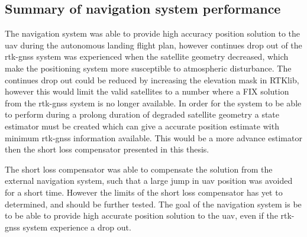 \subsection{Summary of navigation system performance}
The navigation system was able to provide high accuracy position solution to the \gls{uav} during the autonomous landing flight plan, however continues drop out of the \gls{rtk-gnss} system was experienced when the satellite geometry decreased, which make the positioning system more susceptible to atmospheric disturbance. The continues drop out could be reduced by increasing the elevation mask in RTKlib, however this would limit the valid satellites to a number where a FIX solution from the \gls{rtk-gnss} system is no longer available. In order for the system to be able to perform during a prolong duration of degraded satellite geometry a state estimator must be created which can give a accurate position estimate with minimum \gls{rtk-gnss} information available. This would be a more advance estimator then the short loss compensator presented in this thesis.

The short loss compensator was able to compensate the solution from the external navigation system, such that a large jump in \gls{uav} position was avoided for a short time. However the limits of the short loss compensator has yet to determined, and should be further tested. The goal of the navigation system is be to be able to provide high accurate position solution to the \gls{uav}, even if the \gls{rtk-gnss} system experience a drop out.
